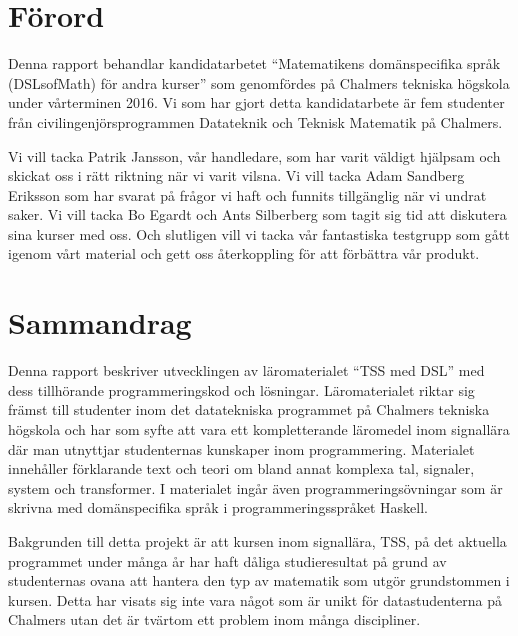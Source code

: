 \documentclass[12pt,a4paper,twoside,openright]{article}
\date{\today}
\begin{document}



\setlength{\parskip}{2mm}
\setlength{\parindent}{0pt}

\section*{Förord}
Denna rapport behandlar kandidatarbetet ``Matematikens domänspecifika språk
(DSLsofMath) för andra kurser'' som genomfördes på Chalmers tekniska högskola
 under vårterminen 2016. Vi som har gjort detta kandidatarbete är fem studenter
från civilingenjörsprogrammen Datateknik och Teknisk Matematik på Chalmers.

Vi vill tacka Patrik Jansson, vår handledare, som har varit väldigt hjälpsam
och skickat oss i rätt riktning när vi varit vilsna. Vi vill tacka Adam Sandberg Eriksson
som har svarat på frågor vi haft och funnits tillgänglig när vi undrat saker. Vi
vill tacka Bo Egardt och Ants Silberberg som tagit sig tid att diskutera sina
kurser med oss. Och slutligen vill vi tacka vår fantastiska testgrupp som gått igenom vårt
material och gett oss återkoppling för att förbättra vår produkt.

\newpage

\thispagestyle{plain}

\section*{Sammandrag}
Denna rapport beskriver utvecklingen av läromaterialet ``TSS med DSL'' med dess
tillhörande programmeringskod och lösningar. Läromaterialet riktar sig främst
till studenter inom det datatekniska programmet på Chalmers tekniska högskola och har som syfte att
vara ett kompletterande läromedel inom signallära där man utnyttjar studenternas
kunskaper inom programmering. Materialet innehåller förklarande text och teori
om bland annat komplexa tal, signaler, system och transformer. I materialet
ingår även programmeringsövningar som är skrivna med domänspecifika språk i
programmeringsspråket \gls{Haskell}.

Bakgrunden till detta projekt är att kursen inom signallära, TSS, på det
aktuella programmet under många år har haft dåliga studieresultat på
grund av studenternas ovana att hantera den typ av matematik som utgör
grundstommen i kursen. Detta har visats sig inte vara något som är unikt
för datastudenterna på Chalmers utan det är tvärtom ett problem inom många
discipliner.
\end{document}
